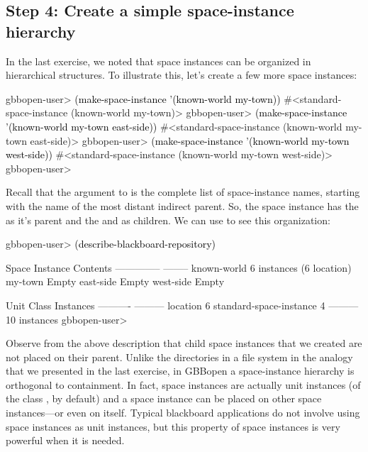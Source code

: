 \documentclass[10pt,twoside,english,pdftex]{article}
\begin{document}
\subsection*{Step 4: Create a simple space-instance hierarchy}

%
%
In the last exercise, we noted that space instances can be organized in
hierarchical structures.  To illustrate this, let's create a few more space
instances:
%
\W\supp
\begin{example}
\textcolor{darkergray}{%
  gbbopen-user> \textcolor{black}{(make-space-instance '(known-world my-town))}
  #<standard-space-instance (known-world my-town)>
  gbbopen-user> \textcolor{black}{(make-space-instance '(known-world my-town east-side))}
  #<standard-space-instance (known-world my-town east-side)>
  gbbopen-user> \textcolor{black}{(make-space-instance '(known-world my-town west-side))}
  #<standard-space-instance (known-world my-town west-side)>
  gbbopen-user>}
\end{example}

%
Recall that the  argument to
 is the complete list of space-instance
names, starting with the name of the most distant indirect parent.  So, the
 space instance has the  as it's
parent and the  and  as
children.  We can use  to see
this organization:
%
\W\supp
\begin{example}
\textcolor{darkergray}{%
  gbbopen-user> \textcolor{black}{(describe-blackboard-repository)}

  Space Instance                Contents
  --------------                --------
  known-world                   6 instances (6 location)
     my-town                    Empty
        east-side               Empty
        west-side               Empty

  Unit Class                    Instances
  ----------                    ---------
  location                              6
  standard-space-instance               4
                                ---------
                                       10 instances
  gbbopen-user>}
\end{example}

%
%
Observe from the above description that child space instances that we created
are not placed on their parent.  Unlike the directories in a file system in
the analogy that we presented in the last exercise, in GBBopen a
space-instance hierarchy is orthogonal to containment.  In fact, space
instances are actually unit instances (of the class
, by default) and a space instance can
be placed on other space instances---or even on itself.  Typical blackboard
applications do not involve using space instances as unit instances, but this
property of space instances is very powerful when it is needed.
\end{document}
